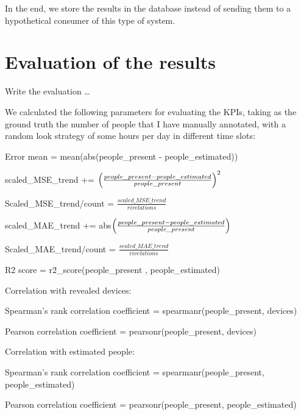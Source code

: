 In the end, we store the results in the database instead of sending them to a hypothetical consumer of this type of system.


\section{Evaluation of the results}
\label{sec:evalres}
\vspace{0.2 cm} 

Write the evaluation \dots

We calculated the following parameters for evaluating the KPIs, taking as the ground truth the number of people that I have manually annotated, with a random look strategy of some hours per day in different time slots:

Error mean = mean(abs(people\_present - people\_estimated))

scaled\_MSE\_trend +=  $\Bigl(\frac{people\_present - people\_estimated}{people\_present} \Bigr)^{2}$

Scaled\_MSE\_trend/count = $\frac{scaled\_MSE\_trend}{rivelations}$

scaled\_MAE\_trend += abs$\Bigl(\frac{people\_present - people\_estimated}{people\_present} \Bigr)$

Scaled\_MAE\_trend/count = $\frac{scaled\_MAE\_trend}{rivelations}$

R2 score = r2\_score(people\_present , people\_estimated)

Correlation with revealed devices:

Spearman's rank correlation coefficient = spearmanr(people\_present, devices)

Pearson correlation coefficient = pearsonr(people\_present, devices)

Correlation with estimated people:

Spearman's rank correlation coefficient = spearmanr(people\_present, people\_estimated)

Pearson correlation coefficient = pearsonr(people\_present, people\_estimated)
